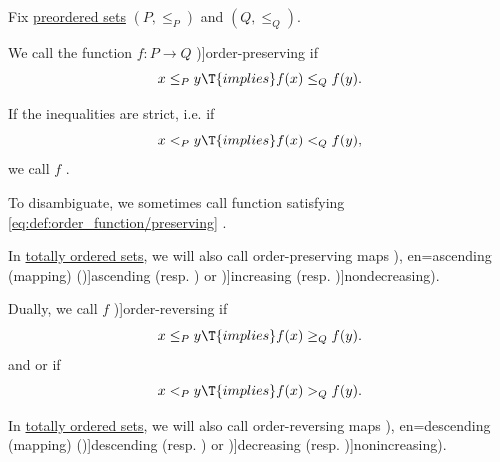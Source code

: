 \begin{definition}\label{def:order_function}\mimprovised
  Fix \hyperref[def:preordered_set]{preordered sets} \( (P, \leq_P) \) and \( (Q, \leq_Q) \).

  \begin{thmenum}
     We call the function \( f: P \to Q \) \term[en=order-preserving (mapping) (\cite[def. 9.2]{Harzheim2005OrderedSets})]{order-preserving} if
    \begin{equation}\label{eq:def:order_function/preserving}
      x \leq_P y \T{implies} f(x) \leq_Q f(y).
    \end{equation}

    If the inequalities are strict, i.e. if
    \begin{equation}\label{eq:def:order_function/preserving/strict}
      x <_P y \T{implies} f(x) <_Q f(y),
    \end{equation}
    we call \( f \) .

    To disambiguate, we sometimes call function satisfying \eqref{eq:def:order_function/preserving} .

    In \hyperref[def:totally_ordered_set]{totally ordered sets}, we will also call order-preserving maps \term[ru=возрастающая (функция) (\cite[\S 47]{Фихтенгольц1968ОсновыАнализаТом1}), en=ascending (mapping) (\cite[def. 9.2]{Harzheim2005OrderedSets})]{ascending} (resp. ) or \term[en=increasing (mapping) (\cite[def. 9.2]{Harzheim2005OrderedSets})]{increasing} (resp. \term[ru=неубывающая (функция) (\cite[\S 47]{Фихтенгольц1968ОсновыАнализаТом1})]{nondecreasing}).

     Dually, we call \( f \) \term[en=order-reversing map (\cite[\S 3.17]{Schechter1997AnalysisHandbook})]{order-reversing} if
    \begin{equation}\label{eq:def:order_function/reversing}
      x \leq_P y \T{implies} f(x) \geq_Q f(y).
    \end{equation}
    and or  if
    \begin{equation}\label{eq:def:order_function/reversing/strict}
      x <_P y \T{implies} f(x) >_Q f(y).
    \end{equation}

    In \hyperref[def:totally_ordered_set]{totally ordered sets}, we will also call order-reversing maps \term[ru=убывающая (функция) (\cite[\S 47]{Фихтенгольц1968ОсновыАнализаТом1}), en=descending (mapping) (\cite[def. 9.2]{Harzheim2005OrderedSets})]{descending} (resp. ) or \term[en=decreasing (mapping) (\cite[def. 9.2]{Harzheim2005OrderedSets})]{decreasing} (resp. \term[ru=невозрастающая (функция) (\cite[\S 47]{Фихтенгольц1968ОсновыАнализаТом1})]{nonincreasing}).


\end{thmenum}
\end{definition}
